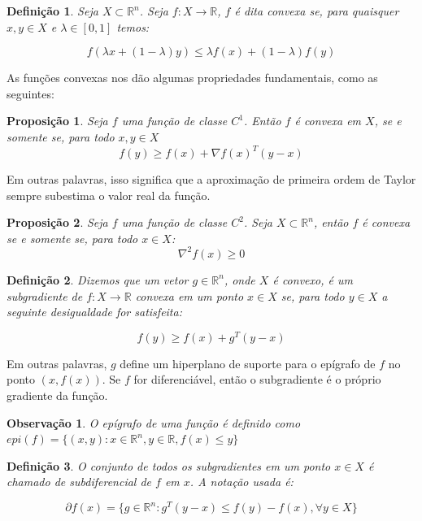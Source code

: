 \documentclass[12pt]{article}
\newtheorem{observation}{Observação}
\newtheorem{definition}{Definição}
\newtheorem{proposition}{Proposição}
\begin{document}
\begin{definition}
Seja $X \subset \mathbb{R}^n$. Seja $f : X \to \mathbb{R}$, $f$ é dita convexa se, para quaisquer $x,y \in X$ e $\lambda \in [0,1]$ temos:

\[
f(\lambda x + ( 1-\lambda ) y ) \leq \lambda f(x) + ( 1 - \lambda )f(y)
\]
\end{definition}

As funções convexas nos dão algumas propriedades fundamentais, como as seguintes:

\begin{proposition}
Seja $f$ uma função de classe $C^1$. Então $f$ é convexa em $X$, se e somente se, para todo $x,y \in X$
\[
f(y) \geq f(x) + \nabla f(x)^T(y-x)
\]
\end{proposition}
Em outras palavras, isso significa que a aproximação de primeira ordem de Taylor sempre subestima o valor real da função.

\begin{proposition}
    
Seja $f$ uma função de classe $C^2$. Seja $X \subset \mathbb{R}^n$, então $f$ é convexa se e somente se, para todo $x \in X$:
\[
\nabla^2 f(x) \geq 0
\]
\end{proposition}

\begin{definition}

Dizemos que um vetor $g \in \mathbb{R}^n$, onde $X$ é convexo, é um subgradiente de $f : X \to \mathbb{R}$ convexa em um ponto $x \in X$ se, para todo $y \in X$ a seguinte desigualdade for satisfeita:

\[
f(y) \geq f(x) + g^T (y-x)
\]
\end{definition}

Em outras palavras, $g$ define um hiperplano de suporte para o epígrafo de $f$ no ponto $(x, f(x))$. Se $f$ for diferenciável, então o subgradiente é o próprio gradiente da função.
\begin{observation}
    O epígrafo de uma função é definido como $epi(f) = \{(x,y) : x \in \mathbb{R}^n, y \in \mathbb{R}, f(x) \leq y\}$
\end{observation}

\begin{definition}
O conjunto de todos os subgradientes em um ponto $x \in X$ é chamado de subdiferencial de $f$ em $x$. A notação usada é:

\[
\partial f(x) = \{ g \in \mathbb{R}^n : g^T(y-x) \leq f(y) - f(x), \forall y \in X\}
\]
\end{definition}
\end{document}
